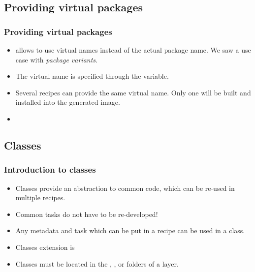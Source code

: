 \subsection{Providing virtual packages}

\begin{frame}
  \frametitle{Providing virtual packages}
  \begin{itemize}
    \item {} allows to use virtual names instead of the actual
          package name. We saw a use case with \emph{package
          variants}.
    \item The virtual name is specified through the 
          variable.
    \item Several recipes can provide the same virtual name. Only one
          will be built and installed into the generated image.
    \item {}
  \end{itemize}
\end{frame}

\subsection{Classes}

\begin{frame}
  \frametitle{Introduction to classes}
  \begin{itemize}
    \item Classes provide an abstraction to common code, which can be
          re-used in multiple recipes.
    \item Common tasks do not have to be re-developed!
    \item Any metadata and task which can be put in a recipe can be
          used in a class.
    \item Classes extension is 
    \item Classes must be located in the ,
      , or  folders of a layer.
  \end{itemize}
\end{frame}

